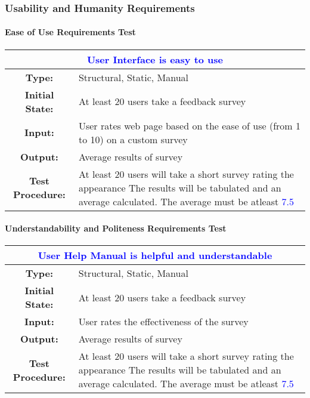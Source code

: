 \documentclass[12pt, titlepage]{article}
\newcommand{\acceptableRating}{\textcolor{blue}{7.5 }}
\begin{document}
\subsubsection{Usability and Humanity Requirements}

\paragraph{Ease of Use Requirements Test}

\begin{center}
\begin{table}[H]
\begin{tabularx}{\textwidth}{| c X |}
\hline
\multicolumn{2}{|c|}{\textbf{\textcolor{blue}{User Interface is easy to use}}}\\
\hline
\textbf{Type: } & Structural, Static, Manual\\
\textbf{Initial State: } & At least 20 users take a feedback survey\\
\textbf{Input: } & User rates web page based on the ease of use (from 1 to 10) on a custom survey\\
\textbf{Output: } & Average results of survey \\
\textbf{Test Procedure:  } & At least 20 users will take a short survey rating the appearance The results will be tabulated and an average calculated. The average must be atleast \acceptableRating \\
\hline
\end{tabularx}
\end{table}
\end{center}

\paragraph{Understandability and Politeness Requirements Test}

\begin{center}
\begin{table}[H]
\begin{tabularx}{\textwidth}{| c X |}
\hline
\multicolumn{2}{|c|}{\textbf{\textcolor{blue}{User Help Manual is helpful and understandable}}}\\
\hline
\textbf{Type: } & Structural, Static, Manual\\
\textbf{Initial State: } & At least 20 users take a feedback survey\\
\textbf{Input: } & User rates the effectiveness of the survey\\
\textbf{Output: } & Average results of survey \\
\textbf{Test Procedure:  } & At least 20 users will take a short survey rating the appearance The results will be tabulated and an average calculated. The average must be atleast \acceptableRating \\
\hline
\end{tabularx}
\end{table}
\end{center}
\end{document}
